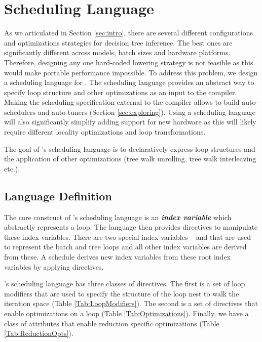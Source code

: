 \section{Scheduling Language}
\label{sec:schedule}
As we articulated in Section \ref{sec:intro}, there are several 
different configurations and optimizations strategies for decision 
tree inference. The best ones are significantly different across
models, batch sizes and hardware platforms. Therefore, designing
any one hard-coded lowering strategy is not feasible as this would 
make portable performance impossible. To address this problem, we 
design a scheduling language for \Treebeard{}. The scheduling 
language provides an abstract way to specify loop structure and 
other optimizations as an input to the compiler. Making the 
scheduling specification external to the compiler allows to build 
auto-schedulers and auto-tuners (Section \ref{sec:exploring}).
Using a scheduling language will also significantly simplify 
adding support for new hardware as this will likely require
different locality optimizations and loop transformations.

The goal of \Treebeard{}'s scheduling language is to declaratively
express loop structures and the application of other optimizations 
(tree walk unrolling, tree walk interleaving etc.). 

\subsection{Language Definition}
The core construct of \Treebeard{}'s scheduling language is an 
\textbf{\emph{index variable}} which abstractly represents a loop. 
The language then provides directives to manipulate these index 
variables. There are two special index variables --  and
 that are used to represent the batch and tree loops and all 
other index variables are derived from these. A schedule derives 
new index variables from these root index variables by applying
directives. 

\Treebeard{}'s scheduling language has three classes of directives. The first is a set 
of loop modifiers that are used to specify the structure of the loop nest to
walk the iteration space (Table \ref{Tab:LoopModifiers}). The second is a set of 
directives that enable optimizations on a loop (Table \ref{Tab:Optimizations}). 
Finally, we have a class of attributes that enable reduction specific optimizations
(Table \ref{Tab:ReductionOpts}).

